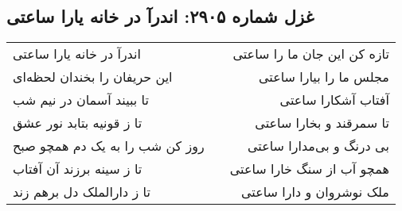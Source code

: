 \begin{center}
\section*{غزل شماره ۲۹۰۵: اندرآ در خانه یارا ساعتی}
\label{sec:2905}
\begin{longtable}{l p{0.5cm} r}
اندرآ در خانه یارا ساعتی
&&
تازه کن این جان ما را ساعتی
\\
این حریفان را بخندان لحظه‌ای
&&
مجلس ما را بیارا ساعتی
\\
تا ببیند آسمان در نیم شب
&&
آفتاب آشکارا ساعتی
\\
تا ز قونیه بتابد نور عشق
&&
تا سمرقند و بخارا ساعتی
\\
روز کن شب را به یک دم همچو صبح
&&
بی درنگ و بی‌مدارا ساعتی
\\
تا ز سینه برزند آن آفتاب
&&
همچو آب از سنگ خارا ساعتی
\\
تا ز دارالملک دل برهم زند
&&
ملک نوشروان و دارا ساعتی
\\
\end{longtable}
\end{center}
